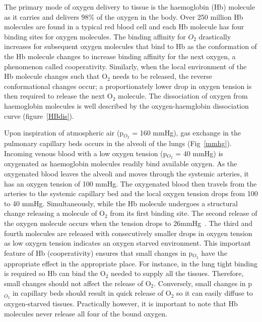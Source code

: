  The primary mode of oxygen delivery to tissue is the haemoglobin (\acs{Hb}) molecule as it carries and delivers 98\% of the oxygen in the body. 
 Over 250 million \acs{Hb} molecules are found in a typical red blood cell and each \acs{Hb} molecule has four binding sites for oxygen molecules. 
 The binding affinity for ${O_2}$ drastically increases for subsequent oxygen molecules that bind to \acs{Hb} as the conformation of the \acs{Hb} molecule changes to increase binding affinity for the next oxygen, a phenomenon called cooperativity. 
 Similarly, when the local environment of the \acs{Hb} molecule changes such that O$_2$ needs to be released, the reverse conformational changes occur; a proportionately lower drop in oxygen tension is then required to release the next O$_2$ molecule. 
 The dissociation of oxygen from haemoglobin molecules is well described by the oxygen-haemglobin dissociation curve (figure~\ref{HBdis}).


 Upon inspiration of atmospheric air (p$_{O_2}$ = 160 mmHg), gas exchange in the pulmonary capillary beds occurs in the alveoli of the lungs (Fig~\ref{mmhg}).
 Incoming venous blood with a low oxygen tension (p$_{O_2}$ = 40 mmHg) is oxygenated as haemoglobin molecules readily bind available oxygen. 
 As the oxygenated blood leaves the alveoli and moves through the systemic arteries, it has an oxygen tension of 100 mmHg. 
 The oxygenated blood then travels from the arteries to the systemic capillary bed and the local oxygen tension drops from 100 to 40 mmHg.
 Simultaneously, while the \acs{Hb} molecule undergoes a structural change releasing a molecule of O$_2$ from its first binding site.  
 The second release of the oxygen molecule occurs when the tension drops to 26mmHg~\cite{GomezCambronero:2001hu}. 
 The third and fourth molecules are released with consecutively smaller drops in oxygen tension as low oxygen tension indicates an oxygen starved environment. This important feature of \acs{Hb} (cooperativity) ensures that small changes in p$_{O_2}$ have the appropriate effect in the appropriate place. 
 For instance, in the lung tight binding is required so \acs{Hb} can bind the O$_2$ needed to supply all the tissues.
 Therefore, small changes should not affect the release of O$_2$.
 Conversely, small changes in p$_{O_2}$ in capillary beds should result in quick release of O$_2$ so it can easily diffuse to oxygen-starved tissues. 
 Practically however, it is important to note that \acs{Hb} molecules never release all four of the bound oxygen.

